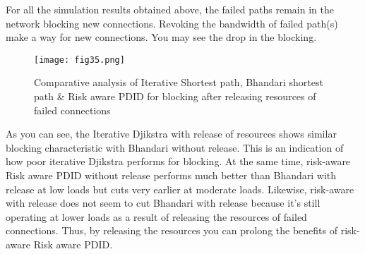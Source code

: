 For all the simulation results obtained above, the failed paths remain in the network blocking new connections. Revoking the bandwidth of failed path(s) make a way for new connections. You may see the drop in the blocking. 

\begin{figure}[hbt!]
\centering
\texttt{[image: fig35.png]}
\caption{Comparative analysis of Iterative Shortest path, Bhandari shortest path & Risk aware PDID for blocking after releasing resources of failed connections}
\label{fig:all3ReleaseBlock}
\end{figure}


 As you can see, the Iterative Djikstra with release of resources shows similar blocking characteristic with Bhandari without release. This is an indication of how poor iterative Djikstra performs for blocking. At the same time, risk-aware Risk aware PDID without release performs much better than Bhandari with release at low loads but cuts very earlier at moderate loads. Likewise, risk-aware with release does not seem to cut Bhandari with release because it's still operating at lower loads as a result of releasing the resources of failed connections. Thus, by releasing the resources you can prolong the benefits of risk-aware Risk aware PDID.
	
